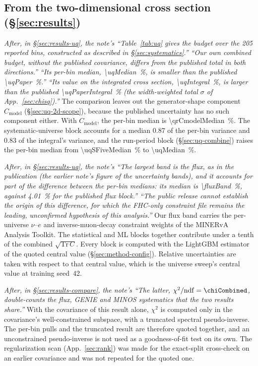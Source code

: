 \subsection{From the two-dimensional cross section (\S\ref{sec:results})}
\emph{After, in \S\ref{sec:results-uq}, the note's ``Table~\ref{tab:uq} gives the budget over the 205 reported bins, constructed as described in \S\ref{sec:systematics}.'' ``Our own combined budget, without the published covariance, differs from the published total in both directions.'' ``Its per-bin median, \SI{\uqMedian}{\percent}, is smaller than the published \SI{\uqPaper}{\percent}.'' ``Its value on the integrated cross section, \SI{\uqIntegral}{\percent}, is larger than the published \SI{\uqPaperIntegral}{\percent} (the width-weighted total $\sigma$ of App.~\ref{sec:chisq}).''}
The comparison leaves out the generator-shape component $C_{\mathrm{model}}$ (\S\ref{sec:uq-2d-scope}), because the published uncertainty has no such component either. With $C_{\mathrm{model}}$, the per-bin median is \SI{\qrCmodelMedian}{\percent}. The systematic-universe block accounts for a median 0.87 of the per-bin variance and 0.83 of the integral's variance, and the run-period block (\S\ref{sec:uq-combine}) raises the per-bin median from \SI{\uqSFiveMedian}{\percent} to \SI{\uqMedian}{\percent}.

\emph{After, in \S\ref{sec:results-uq}, the note's ``The largest band is the flux, as in the publication (the earlier note's figure of the uncertainty bands), and it accounts for part of the difference between the per-bin medians: its median is \SI{\fluxBand}{\percent}, against \SI{4.01}{\percent} for the published flux block.'' ``The public release cannot establish the origin of this difference, for which the FHC-only constraint file remains the leading, unconfirmed hypothesis of this analysis.''}
Our flux band carries the per-universe $\nu$--$e$ and inverse-muon-decay constraint weights of the MINERvA Analysis Toolkit. The statistical and ML blocks together contribute under a tenth of the combined $\sqrt{\mathrm{Tr}\,C}$. Every block is computed with the LightGBM estimator of the quoted central value (\S\ref{sec:method-config}). Relative uncertainties are taken with respect to that central value, which is the universe sweep's central value at training seed~42.

\emph{After, in \S\ref{sec:results-compare}, the note's ``The latter, $\chi^{2}/\mathrm{ndf}=\chiCombined$, double-counts the flux, GENIE and MINOS systematics that the two results share.''}
With the covariance of this result alone, $\chi^{2}$ is computed only in the covariance's well-constrained subspace, with a truncated spectral pseudo-inverse. The per-bin pulls and the truncated result are therefore quoted together, and an unconstrained pseudo-inverse is not used as a goodness-of-fit test on its own. The regularization scan (App.~\ref{sec:rank}) was made for the exact-split cross-check on an earlier covariance and was not repeated for the quoted one.

